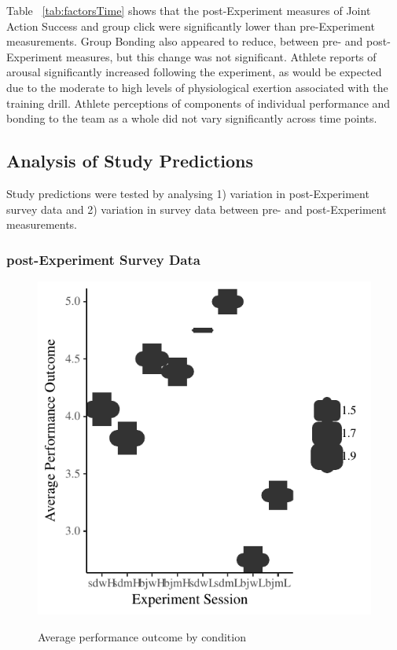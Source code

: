 Table ~\ref{tab:factorsTime} shows that the post-Experiment measures of Joint Action Success and group click were significantly lower than pre-Experiment measurements.  Group Bonding also appeared to reduce, between pre- and post-Experiment measures,  but this change was not significant.  Athlete reports of arousal significantly increased following the experiment, as would be expected due to the moderate to high levels of physiological exertion associated with the training drill.  Athlete perceptions of components of individual performance and bonding to the team as a whole did not vary significantly across time points.








\subsection{Analysis of Study Predictions}

Study predictions were tested by analysing 1) variation in post-Experiment survey data and 2) variation in survey data between pre- and post-Experiment measurements.



\subsubsection{post-Experiment Survey Data}


\begin{figure}
  \centering
  \includegraphics[width=0.5\linewidth,keepaspectratio] {images/fullOutcomeAvgSessionBoxplot-1}
  \label{fig:fullOutcomeAvgSessionBoxplot}
  \caption{Average performance outcome by condition}
\end{figure}




